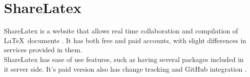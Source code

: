 \section{ShareLatex}

ShareLatex is a website that allows real time collaboration and compilation
of \LaTeX~documents \cite{www-hid-sp18-601-slatex-documentation}. It has both 
free and paid accounts, with slight differences
 in services provided in them.\\
 
ShareLatex has ease of use features, such as having several packages included 
in it server side. It's paid version also has change tracking and GitHub
integration \cite{www-hid-sp18-601-slatex-plans}.